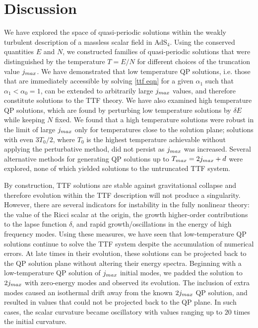 \documentclass[../PhD.tex]{subfiles}
\begin{document}

\section{Discussion}
\label{sec: ttf discussion}

We have explored the space of quasi-periodic solutions within the weakly turbulent description of a massless scalar field in AdS$_4$. Using the conserved quantities $E$ and $N$, we constructed families of quasi-periodic solutions that were distinguished by the temperature $T = E/N$ for different choices of the truncation value $j_{max}$. We have demonstrated that low temperature QP solutions, i.e. those that are immediately accessible by solving \eqref{ttf eqn} for a given $\alpha_1$ such that $\alpha_1 < \alpha_0 = 1$, can be extended to arbitrarily large $j_{max}$ values, and therefore constitute solutions to the TTF theory. We have also examined high temperature QP solutions, which are found by perturbing low temperature solutions by $\delta E$ while keeping $N$ fixed. We found that a high temperature solutions were robust in the limit of large $j_{max}$ only for temperatures close to the solution plane; solutions with even $3 T_0 / 2$, where $T_0$ is the highest temperature achievable without applying the perturbative method, did not persist as $j_{max}$ was increased. Several alternative methods for generating QP solutions up to $T_{max} = 2j_{max} + d$ were explored, none of which yielded solutions to the untruncated TTF system.

By construction, TTF solutions are stable against gravitational collapse and therefore evolution within the TTF description will not produce a singularity. However, there are several indicators for instability in the fully nonlinear theory: the value of the Ricci scalar at the origin, the growth higher-order contributions to the lapse function $\delta$, and rapid growth/oscillations in the energy of high frequency modes. Using these measures, we have seen that low-temperature QP solutions continue to solve the TTF system despite the accumulation of numerical errors. At late times in their evolution, these solutions can be projected back to the QP solution plane without altering their energy spectra. Beginning with a low-temperature QP solution of $j_{max}$ initial modes, we padded the solution to $2j_{max}$ with zero-energy modes and observed its evolution. The inclusion of extra modes caused an isothermal drift away from the known $2j_{max}$ QP solution, and resulted in values that could not be projected back to the QP plane. In such cases, the scalar curvature became oscillatory with values ranging up to $20$ times the initial curvature.
\end{document}
